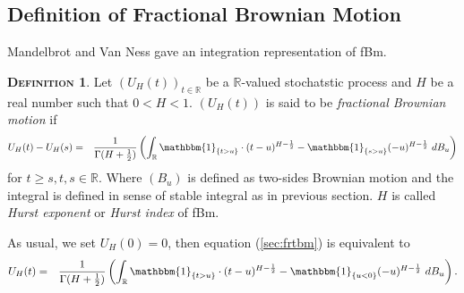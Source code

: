 \documentclass[a4paper, twoside, 11pt]{article}
\theoremstyle{definition}
\newtheorem{definition}{\scshape Definition}[section]
\newcommand{\brkt}[1]{\left({#1} \right)}
\begin{document}
\subsection{Definition of Fractional Brownian Motion}
Mandelbrot and Van Ness \cite{mandelbrot} gave an integration representation of fBm.
\begin{definition}
  Let $(U_H(t))_{t\in \mathbb{R}}$ be a $\mathbb{R}$-valued stochatstic process and $H$ be a real number such that $0<H<1$. $(U_H(t))$ is said to be \emph{fractional Brownian motion} if 
  \begin{eqnarray}
	U_H(t) - U_H(s) &=& \frac{1}{\Gamma(H+\frac{1}{2})}\brkt{\int_{\mathbb{R}} \mathbbm{1}_{\{t > u\}}\cdot (t-u)^{H-\frac{1}{2}} - \mathbbm{1}_{\{s > u\}} (-u)^{H-\frac{1}{2}} \, \mathop{dB_u}}
	\label{sec:frtbm}
  \end{eqnarray}
  for $t\ge s, t, s \in \mathbb{R}$. Where $(B_u)$ is defined as two-sides Brownian motion and the integral is defined in sense of stable integral as in previous section. $H$ is called \emph{Hurst exponent} or \emph{Hurst index} of fBm.
\end{definition}

As usual, we set $U_H(0) = 0$, then equation (\ref{sec:frtbm}) is equivalent to
	 \begin{eqnarray}
	   U_H(t) &=& \frac{1}{\Gamma(H+\frac{1}{2})}\brkt{\int_{\mathbb{R}} \mathbbm{1}_{\{t > u\}}\cdot (t-u)^{H-\frac{1}{2}} - \mathbbm{1}_{\{u < 0\}} (-u)^{H-\frac{1}{2}} \, \mathop{dB_u}}.
	\label{sec:fbm}
  \end{eqnarray}
\end{document}
